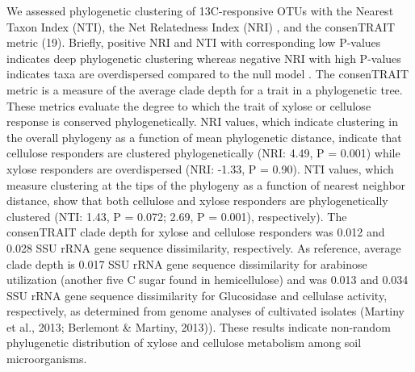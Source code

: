 We assessed phylogenetic clustering of 13C-responsive OTUs with the Nearest
Taxon Index (NTI), the Net Relatedness Index (NRI) \citep{Webb2000}, and the consenTRAIT
metric (19). Briefly, positive NRI and NTI with corresponding low P-values
indicates deep phylogenetic clustering whereas negative NRI with high P-values
indicates taxa are overdispersed compared to the null model \citep{Evans2014a}.
The consenTRAIT metric is a measure of the average clade depth for a trait
in a phylogenetic tree. These metrics evaluate the degree to which the trait of
xylose or cellulose response is conserved phylogenetically. NRI values, which
indicate clustering in the overall phylogeny as a function of mean phylogenetic
distance, indicate that cellulose responders are clustered phylogenetically
(NRI: 4.49, P = 0.001) while xylose responders are overdispersed (NRI: -1.33,
P = 0.90). NTI values, which measure clustering at the tips of the phylogeny as
a function of nearest neighbor distance, show that both cellulose and xylose
responders are phylogenetically clustered (NTI: 1.43, P = 0.072; 2.69,
P = 0.001), respectively). The consenTRAIT clade depth for xylose and cellulose
responders was 0.012 and 0.028 SSU rRNA gene sequence dissimilarity,
respectively. As reference, average clade depth is 0.017 SSU rRNA gene sequence
dissimilarity for arabinose utilization (another five C sugar found in
hemicellulose) and was 0.013 and 0.034 SSU rRNA gene sequence dissimilarity for
Glucosidase and cellulase activity, respectively, as determined from genome
analyses of cultivated isolates \citep{Martiny2013} (Martiny et al., 2013;
Berlemont & Martiny, 2013)). These results indicate non-random phylugenetic
distribution of xylose and cellulose metabolism among soil microorganisms.





